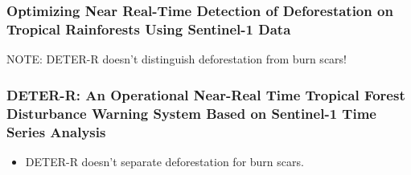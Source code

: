 \documentclass{beamer}
\begin{document}
\begin{frame}[t, allowframebreaks]
    \frametitle{Optimizing Near Real-Time Detection of Deforestation on 
    Tropical Rainforests Using Sentinel-1 Data~\cite{doblas2020}}
    NOTE: DETER-R doesn't distinguish deforestation from burn scars!
\end{frame}



\begin{frame}[t, allowframebreaks]
    \frametitle{DETER-R: An Operational Near-Real Time Tropical Forest 
    Disturbance Warning System Based on Sentinel-1 Time Series Analysis~\cite{doblas2022}}
    \begin{itemize}
        \item DETER-R doesn't separate deforestation for burn scars.

\end{itemize}
\end{frame}
\end{document}
